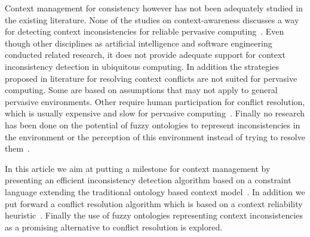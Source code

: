 \documentclass[journal]{vgtc}                %
\begin{document}
Context management for consistency however has not been adequately studied in the existing literature. None of the studies on context-awareness discusses a way for detecting context inconsistencies for reliable pervasive computing~\cite{xu:2010:PCC, bu:2006:CCM}. Even though other disciplines as artificial intelligence and software engineering conducted related research, it does not provide adequate support for context inconsistency detection in ubiquitous computing. In addition the strategies proposed in literature for resolving context conflicts are not suited for pervasive computing. Some are based on assumptions that may not apply to general pervasive environments. Other require human participation for conflict resolution, which is usually expensive and slow for pervasive computing~\cite{xu:2010:PCC}. Finally no research has been done on the potential of fuzzy ontologies to represent inconsistencies in the environment or the perception of this environment instead of trying to resolve them~\cite{ko:2009:IOFO}.

In this article we aim at putting a milestone for context management by presenting an efficient inconsistency detection algorithm based on a constraint language extending the traditional ontology based context model~\cite{xu:2010:PCC}. In addition we put forward a conflict resolution algorithm which is based on a context reliability heuristic~\cite{bu:2006:CCM}. Finally the use of fuzzy ontologies representing context inconsistencies as a promising alternative to conflict resolution is explored.
\end{document}
